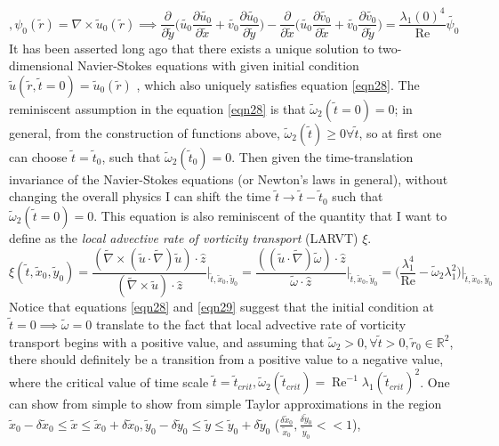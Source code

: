 \documentclass{article}
\begin{document}
\begin{equation} \label{eqn28}
, \psi_0(\tilde{r}) = \nabla \times \tilde{u}_0(\tilde{r}) \implies \frac{\partial}{\partial \tilde{y}}\bigg(\tilde{u_0}\frac{\partial \tilde{u_0}}{\partial \tilde{x}}+\tilde{v_0}\frac{\partial \tilde{u_0}}{\partial \tilde{y}}\bigg)-\frac{\partial}{\partial \tilde{x}}\bigg(\tilde{u_0}\frac{\partial \tilde{v_0}}{\partial \tilde{x}}+\tilde{v_0}\frac{\partial \tilde{v_0}}{\partial \tilde{y}}\bigg) = \frac{\lambda_1(0)^4}{\operatorname{Re}}\tilde{\psi_0}
\end{equation}
It has been asserted long ago that there exists a unique solution to two-dimensional Navier-Stokes equations with given initial condition $\tilde{u}(\tilde{r},\tilde{t} = 0) = \tilde{u}_0(\tilde{r})$ \cite{exactSolution}, which also uniquely satisfies equation \ref{eqn28}. The reminiscent assumption in the equation \ref{eqn28} is that $\tilde{\omega}_2(\tilde{t} = 0) = 0$; in general, from the construction of functions above, $\tilde{\omega}_2(\tilde{t}) \ge 0 \forall \tilde{t}$, so at first one can choose $\tilde{t} = \tilde{t}_0$, such that $\tilde{\omega}_2(\tilde{t}_0) = 0$. Then given the time-translation invariance of the Navier-Stokes equations (or Newton's laws in general), without changing the overall physics I can shift the time $\tilde{t} \to \tilde{t}-\tilde{t}_0$ such that $\tilde{\omega}_2(\tilde{t}=0) = 0$. This equation is also reminiscent of the quantity that I want to define as the \textit{local advective rate of vorticity transport} (LARVT) $\xi$.
\begin{equation} \label{eqn29}
\xi(\tilde{t},\tilde{x}_0,\tilde{y}_0) = \frac{(\tilde{\nabla}\times(\tilde{u}\cdot\tilde{\nabla})\tilde{u})\cdot\hat{z}}{(\tilde{\nabla}\times\tilde{u})\cdot\hat{z}}\bigg|_{\tilde{t},\tilde{x}_0,\tilde{y}_0} = \frac{((\tilde{u}\cdot\tilde{\nabla})\tilde{\omega})\cdot\hat{z}}{\tilde{\omega}\cdot\hat{z}}\bigg|_{\tilde{t},\tilde{x}_0,\tilde{y}_0} = \bigg(\frac{\lambda_1^4}{\operatorname{Re}}-\tilde{\omega}_2\lambda_1^2\bigg)\bigg|_{\tilde{t},\tilde{x}_0,\tilde{y}_0}
\end{equation}
Notice that equations \ref{eqn28} and \ref{eqn29} suggest that the initial condition at $\tilde{t} = 0 \implies \tilde{\omega} = 0$ translate to the fact that local advective rate of vorticity transport begins with a positive value, and assuming that $\tilde{\omega}_2 > 0, \forall \tilde{t} > 0, \tilde{r}_0 \in \mathbb{R}^2$, there should definitely be a transition from a positive value to a negative value, where the critical value of time scale $\tilde{t} = \tilde{t}_{crit}, \tilde{\omega}_2(\tilde{t}_{crit}) = \operatorname{Re}^{-1}\lambda_1(\tilde{t}_{crit})^2$. One can show from simple to show from simple Taylor approximations in the region $\tilde{x}_0 - \delta \tilde{x}_0 \le \tilde{x} \le \tilde{x}_0 + \delta \tilde{x}_0, \tilde{y}_0 - \delta \tilde{y}_0 \le \tilde{y} \le \tilde{y}_0 + \delta \tilde{y}_0$ ($\frac{\delta \tilde{x}_0}{\tilde{x}_0}, \frac{\delta \tilde{y}_0}{\tilde{y}_0} << 1$), 
\end{document}
